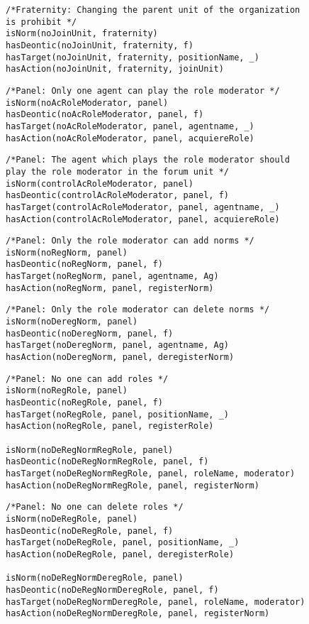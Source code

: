 \begin{verbatim}
/*Fraternity: Changing the parent unit of the organization 
is prohibit */
isNorm(noJoinUnit, fraternity)
hasDeontic(noJoinUnit, fraternity, f)
hasTarget(noJoinUnit, fraternity, positionName, _)
hasAction(noJoinUnit, fraternity, joinUnit)
\end{verbatim}

\begin{verbatim}
/*Panel: Only one agent can play the role moderator */
isNorm(noAcRoleModerator, panel)
hasDeontic(noAcRoleModerator, panel, f)
hasTarget(noAcRoleModerator, panel, agentname, _)
hasAction(noAcRoleModerator, panel, acquiereRole)
\end{verbatim}

\begin{verbatim}
/*Panel: The agent which plays the role moderator should 
play the role moderator in the forum unit */
isNorm(controlAcRoleModerator, panel)
hasDeontic(controlAcRoleModerator, panel, f)
hasTarget(controlAcRoleModerator, panel, agentname, _)
hasAction(controlAcRoleModerator, panel, acquiereRole)
\end{verbatim}

\begin{verbatim}
/*Panel: Only the role moderator can add norms */
isNorm(noRegNorm, panel)
hasDeontic(noRegNorm, panel, f)
hasTarget(noRegNorm, panel, agentname, Ag)
hasAction(noRegNorm, panel, registerNorm)
\end{verbatim}

\begin{verbatim}
/*Panel: Only the role moderator can delete norms */
isNorm(noDeregNorm, panel)
hasDeontic(noDeregNorm, panel, f)
hasTarget(noDeregNorm, panel, agentname, Ag)
hasAction(noDeregNorm, panel, deregisterNorm)
\end{verbatim}


\begin{verbatim}
/*Panel: No one can add roles */
isNorm(noRegRole, panel)
hasDeontic(noRegRole, panel, f)
hasTarget(noRegRole, panel, positionName, _)
hasAction(noRegRole, panel, registerRole)

isNorm(noDeRegNormRegRole, panel)
hasDeontic(noDeRegNormRegRole, panel, f)
hasTarget(noDeRegNormRegRole, panel, roleName, moderator)
hasAction(noDeRegNormRegRole, panel, registerNorm)
\end{verbatim}


\begin{verbatim}
/*Panel: No one can delete roles */
isNorm(noDeRegRole, panel)
hasDeontic(noDeRegRole, panel, f)
hasTarget(noDeRegRole, panel, positionName, _)
hasAction(noDeRegRole, panel, deregisterRole)

isNorm(noDeRegNormDeregRole, panel)
hasDeontic(noDeRegNormDeregRole, panel, f)
hasTarget(noDeRegNormDeregRole, panel, roleName, moderator)
hasAction(noDeRegNormDeregRole, panel, registerNorm)
\end{verbatim}

